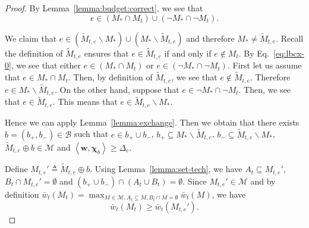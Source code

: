 \documentclass{article}
\newcommand{\M}{\mathcal M}
\newcommand{\B}{\mathcal B}
\newcommand{\del}{\backslash}
\newcommand{\inn}[1]{\left\langle #1 \right\rangle}
\renewcommand{\vec}[1]{\boldsymbol{#1}}
\begin{document}
\begin{proof}
By Lemma~\ref{lemma:budget:correct}, we see that 
\begin{equation}
\label{eq:lbcx-0}
e \in (M_* \cap M_t) \cup ( \neg M_* \cap \neg M_t).
\end{equation}

We claim that $e\in (\tilde M_{t,e} \del M_*) \cup (M_* \del \tilde M_{t,e})$ and therefore $M_* \not= \tilde M_{t,e}$.
Recall the definition of $\tilde M_{t,e}$ ensures that $e\in \tilde M_{t,e}$ if and only if $e\not\in M_t$.
By Eq.~\eqref{eq:lbcx-0}, we see that either $e\in (M_* \cap M_t)$ or $e\in (\neg M_* \cap \neg M_t)$.
First let us assume that $e\in M_*\cap M_t$.
Then, by definition of $\tilde M_{t,e}$, we see that $e\not\in \tilde M_{t,e}$. Therefore $e\in M_* \del \tilde M_{t,e}$.
On the other hand, suppose that $e\in \neg M_* \cap \neg M_t$.
Then, we see that $e\in \tilde M_{t,e}$. This means that $e \in \tilde M_{t,e}\del M_*$.

Hence we can apply Lemma~\ref{lemma:exchange}. Then we obtain that there exists $b=(b_+,b_-)\in \B$ such that 
$e\in b_+\cup b_-$, $b_+\subseteq M_* \del \tilde M_{t,e}$, $b_- \subseteq \tilde M_{t,e} \del M_*$, $\tilde M_{t,e} \oplus b \in \M$ and 
$\inn{\vec w, \vec\chi_b} \ge \Delta_e$.

Define $M_{t,e}' \triangleq \tilde M_{t,e}\oplus b$. 
Using Lemma~\ref{lemma:set-tech}, we have 
$A_t \subseteq M_{t,e}'$, $B_t \cap M_{t,e}' = \emptyset$ and $(b_+\cup b_-) \cap (A_t \cup B_t) = \emptyset$.
Since $M_{t,e}'\in \M$ and by definition $\bar w_t(M_t) = \max_{M\in \M, A_t\subseteq M, B_t \cap M = \emptyset} \bar w_t(M)$, we have
\begin{equation}
\label{eq:lbcx-1}
\bar w_t(M_t) \ge \bar w_t(M_{t,e}').
\end{equation}


\end{proof}
\end{document}
